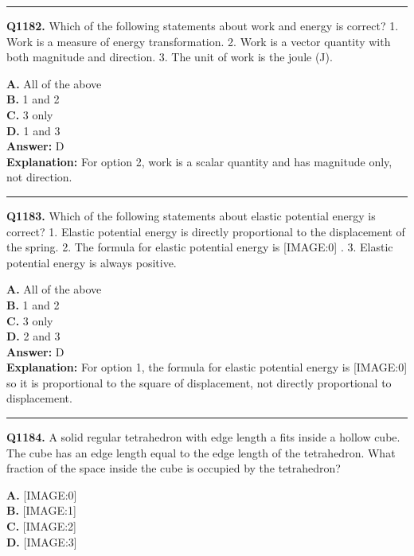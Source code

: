 \documentclass[12pt]{article}
\begin{document}
\hrule
\vspace{1em}


\noindent
\textbf{Q1182.} Which of the following statements about work and energy is correct?
1.
Work is a measure of energy transformation.
2.
Work is a vector quantity with both magnitude and direction.
3.
The unit of work is the joule (J).



\textbf{A.} All of the above \\
\textbf{B.} 1 and 2 \\
\textbf{C.} 3 only \\
\textbf{D.} 1 and 3 \\

\textbf{Answer:} D \\
\textbf{Explanation:} For option 2, work is a scalar quantity and has magnitude only, not direction.

\hrule
\vspace{1em}


\noindent
\textbf{Q1183.} Which of the following statements about elastic potential energy is correct?
1.
Elastic potential energy is directly proportional to the displacement of the spring.
2.
The formula for elastic potential energy is
[IMAGE:0]
.
3.
Elastic potential energy is always positive.



\textbf{A.} All of the above \\
\textbf{B.} 1 and 2 \\
\textbf{C.} 3 only \\
\textbf{D.} 2 and 3 \\

\textbf{Answer:} D \\
\textbf{Explanation:} For option 1, the formula for elastic potential energy is
[IMAGE:0]
so it is proportional to the square of displacement, not directly proportional to displacement.

\hrule
\vspace{1em}


\noindent
\textbf{Q1184.} A solid regular tetrahedron with edge length a fits inside a hollow cube. The cube has an edge length equal to the edge length of the tetrahedron. What fraction of the space inside the cube is occupied by the tetrahedron?



\textbf{A.} [IMAGE:0] \\
\textbf{B.} [IMAGE:1] \\
\textbf{C.} [IMAGE:2] \\
\textbf{D.} [IMAGE:3] \\
\end{document}
